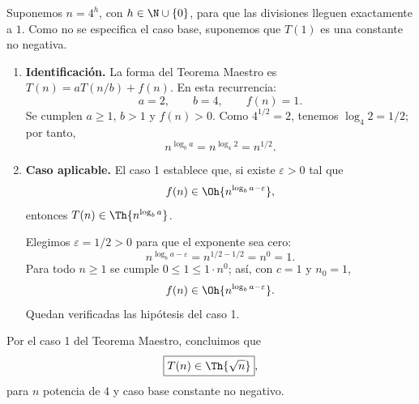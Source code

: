 
Suponemos $n=4^h$, con $h\in\N\cup\{0\}$, para que las divisiones lleguen exactamente a $1$. Como no se especifica el caso base, suponemos que $T(1)$ es una constante no negativa.

\begin{enumerate}
\item \textbf{Identificación.} La forma del Teorema Maestro es $T(n)=aT(n/b)+f(n)$. En esta recurrencia:
\[
a=2,\qquad b=4,\qquad f(n)=1.
\]
Se cumplen $a\ge1$, $b>1$ y $f(n)>0$. Como $4^{1/2}=2$, tenemos $\log_4 2=1/2$; por tanto,
\[
n^{\log_b a}=n^{\log_4 2}=n^{1/2}.
\]

\item \textbf{Caso aplicable.} El caso 1 establece que, si existe $\varepsilon>0$ tal que
\[
f(n)\in\Oh{n^{\log_b a-\varepsilon}},
\]
entonces $T(n)\in\Th{n^{\log_b a}}$.

Elegimos $\varepsilon=1/2>0$ para que el exponente sea cero:
\[
n^{\log_b a-\varepsilon}=n^{1/2-1/2}=n^0=1.
\]
Para todo $n\ge1$ se cumple $0\le1\le1\cdot n^0$; así, con $c=1$ y $n_0=1$,
\[
f(n)\in\Oh{n^{\log_b a-\varepsilon}}.
\]
Quedan verificadas las hipótesis del caso 1.
\end{enumerate}

Por el caso 1 del Teorema Maestro, concluimos que
\[
\boxed{T(n)\in\Th{\sqrt n}},
\]
para $n$ potencia de $4$ y caso base constante no negativo.
\fin
